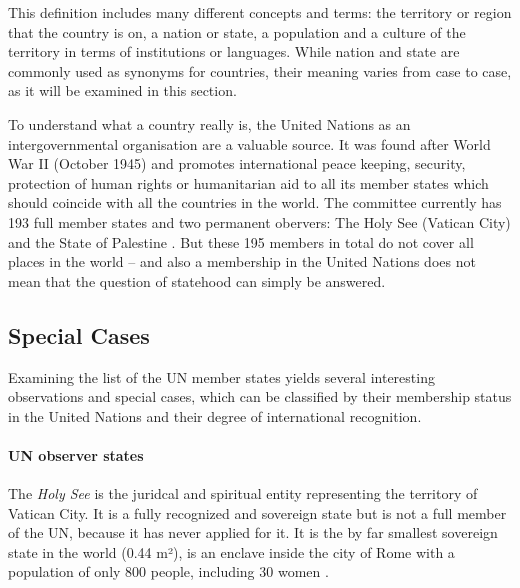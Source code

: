 This definition includes many different concepts and terms: the territory or region that the country is on, a nation or state, a population and a culture of the territory in terms of institutions or languages. While nation and state are commonly used as synonyms for countries, their meaning varies from case to case, as it will be examined in this section.

To understand what a country really is, the United Nations as an intergovernmental organisation are a valuable source. It was found after World War II (October 1945) and promotes international peace keeping, security, protection of human rights or humanitarian aid to all its member states which should coincide with all the countries in the world. The committee currently has 193 full member states and two permanent obervers: The Holy See (Vatican City) and the State of Palestine \cite{UNmembers}. But these 195 members in total do not cover all places in the world -- and also a membership in the United Nations does not mean that the question of statehood can simply be answered.

\subsection{Special Cases} %
\label{sub:special_cases}

Examining the list of the UN member states yields several interesting observations and special cases, which can be classified by their membership status in the United Nations and their degree of international recognition.


\paragraph{UN observer states} %
\label{par:un_observer_states}

The \emph{Holy See} is the juridcal and spiritual entity representing the territory of Vatican City. It is a fully recognized and sovereign state but is not a full member of the UN, because it has never applied for it. It is the by far smallest sovereign state in the world (0.44 m²), is an enclave inside the city of Rome with a population of only 800 people, including 30 women \cite{VaticanPopulation}.

